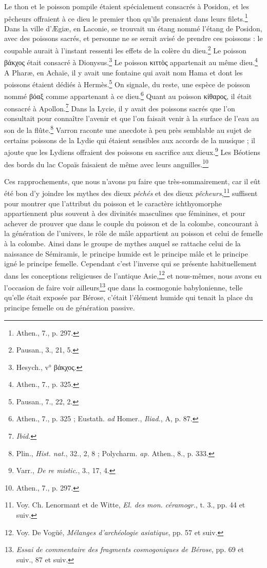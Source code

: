 \documentclass[a4paper, 11pt, oneside, landscape]{article}
\begin{document}
Le thon et le poisson pompile étaient spécialement consacrés à Posidon, et les pêcheurs offraient à ce dieu le premier thon qu'ils prenaient dans leurs filets.\footnote{Athen., 7., p. 297.} Dans la ville d'Ægiæ, en Laconie, se trouvait un étang nommé l'étang de Posidon, avec des poissons sacrés, et personne ne se serait avisé de prendre ces poissons : le coupable aurait à l'instant ressenti les effets de la colère du dieu.\footnote{Pausan., 3., 21, 5.} Le poisson βάκχος était consacré à Dionysus.\footnote{Hesych., v° βάκχος.} Le poisson κιττὸς appartenait au même dieu.\footnote{Athen., 7., p. 325.} A Pharæ, en Achaïe, il y avait une fontaine qui avait nom Hama et dont les poissons étaient dédiés à Hermès.\footnote{Pausan., 7., 22, 2.} On signale, du reste, une espèce de poisson nommé βόαξ comme appartenant à ce dieu.\footnote{Athen., 7., p. 325 ; Eustath. \emph{ad} Homer., \emph{Iliad.}, A, p. 87.} Quant au poisson κίθαρος, il était consacré à Apollon.\footnote{\emph{Ibid.}} Dans la Lycie, il y avait des poissons sacrés que l'on consultait pour connaître l'avenir et que l'on faisait venir à la surface de l'eau au son de la flûte.\footnote{Plin., \emph{Hist. nat.}, 32., 2, 8 ; Polycharm. \emph{ap.} Athen., 8., p. 333.} Varron raconte une anecdote à peu près semblable au sujet de certains poissons de la Lydie qui étaient sensibles aux accords de la musique ; il ajoute que les Lydiens offraient des poissons en sacrifice aux dieux.\footnote{Varr., \emph{De re mistic.}, 3., 17, 4.} Les Béotiens des bords du lac Copaïs faisaient de même avec leurs anguilles.\footnote{Athen., 7., p. 297.}

Ces rapprochements, que nous n'avons pu faire que très-sommairement, car il eût été bon d'y joindre les mythes des dieux \emph{pêchés} et des dieux \emph{pêcheurs},\footnote{Voy. Ch. Lenormant et de Witte, \emph{El. des mon. céramogr.}, t. 3., pp. 44 et suiv.} suffisent pour montrer que l'attribut du poisson et le caractère ichthyomorphe appartiennent plus souvent à des divinités masculines que féminines, et pour achever de prouver que dans le couple du poisson et de la colombe, concourant à la génération de l'univers, le rôle de mâle appartient au poisson et celui de femelle à la colombe. Ainsi dans le groupe de mythes auquel se rattache celui de la naissance de Sémiramis, le principe humide est le principe mâle et le principe igné le principe femelle. Cependant c'est l'inverse qui se présente habituellement dans les conceptions religieuses de l'antique Asie,\footnote{Voy. De Vogüé, \emph{Mélanges d'archéologie asiatique}, pp. 57 et suiv.} et nous-mêmes, nous avons eu l'occasion de faire voir ailleurs\footnote{\emph{Essai de commentaire des fragments cosmogoniques de Bérose}, pp. 69 et suiv., 87 et suiv.} que dans la cosmogonie babylonienne, telle qu'elle était exposée par Bérose, c'était l'élément humide qui tenait la place du principe femelle ou de génération passive.
\end{document}
